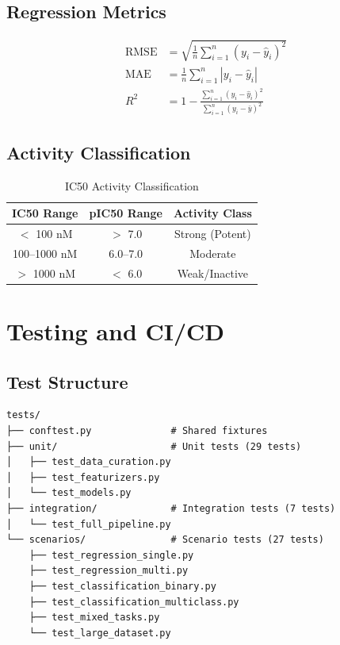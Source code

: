 \documentclass[11pt,a4paper]{article}
\begin{document}
\subsection{Regression Metrics}

\begin{align}
\text{RMSE} &= \sqrt{\frac{1}{n}\sum_{i=1}^{n}(y_i - \hat{y}_i)^2} \\[0.5em]
\text{MAE} &= \frac{1}{n}\sum_{i=1}^{n}|y_i - \hat{y}_i| \\[0.5em]
R^2 &= 1 - \frac{\sum_{i=1}^{n}(y_i - \hat{y}_i)^2}{\sum_{i=1}^{n}(y_i - \bar{y})^2}
\end{align}

\subsection{Activity Classification}

\begin{table}[H]
\centering
\caption{IC50 Activity Classification}
\begin{tabular}{@{}ccc@{}}
\toprule
\textbf{IC50 Range} & \textbf{pIC50 Range} & \textbf{Activity Class} \\
\midrule
$<$ 100 nM & $>$ 7.0 & Strong (Potent) \\
100--1000 nM & 6.0--7.0 & Moderate \\
$>$ 1000 nM & $<$ 6.0 & Weak/Inactive \\
\bottomrule
\end{tabular}
\end{table}

\section{Testing and CI/CD}

\subsection{Test Structure}

\begin{verbatim}
tests/
├── conftest.py              # Shared fixtures
├── unit/                    # Unit tests (29 tests)
│   ├── test_data_curation.py
│   ├── test_featurizers.py
│   └── test_models.py
├── integration/             # Integration tests (7 tests)
│   └── test_full_pipeline.py
└── scenarios/               # Scenario tests (27 tests)
    ├── test_regression_single.py
    ├── test_regression_multi.py
    ├── test_classification_binary.py
    ├── test_classification_multiclass.py
    ├── test_mixed_tasks.py
    └── test_large_dataset.py
\end{verbatim}
\end{document}
